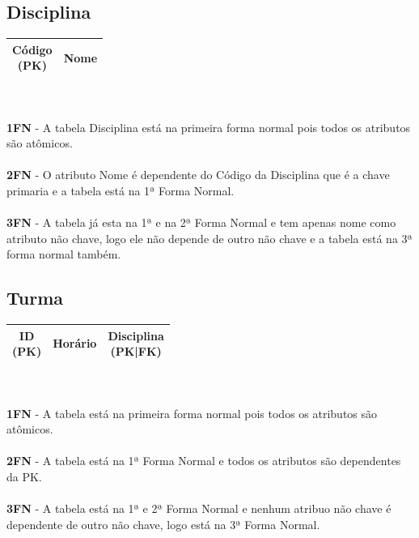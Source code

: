\documentclass[12pt]{article}
\begin{document}
\subsection*{Disciplina}
\begin{tabular}{|c|c|}
    \hline
    \makecell{Código \\(PK)} & Nome \\
    \hline
\end{tabular}
\\
\\
\textbf{1FN} - A tabela Disciplina está na primeira forma normal pois todos os atributos são atômicos. \\
\\
\textbf{2FN} - O atributo Nome é dependente do Código da Disciplina que é a chave primaria e a tabela está na 1ª Forma Normal. \\
\\
\textbf{3FN} - A tabela já esta na 1ª e na 2ª Forma Normal e tem apenas nome como atributo não chave, logo ele não depende de outro não chave e a tabela está na 3ª forma normal também.

\subsection*{Turma}
\begin{tabular}{|c|c|c|}
    \hline
    \makecell{ID \\(PK)} & Horário & \makecell{Disciplina \\(PK|FK)} \\
    \hline
\end{tabular}
\\
\\
\textbf{1FN} - A tabela está na primeira forma normal pois todos os atributos são atômicos. \\
\\
\textbf{2FN} - A tabela está na 1ª Forma Normal e todos os atributos são dependentes da PK. \\
\\
\textbf{3FN} - A tabela está na 1ª e 2ª Forma Normal e nenhum atribuo não chave é dependente de outro não chave, logo está na 3ª Forma Normal.
\end{document}
